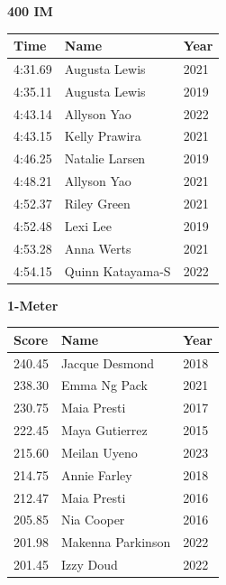 \vspace{1.2em}
\noindent\begin{minipage}[t]{0.48\textwidth}
\centering
\textbf{\textcolor{teamprimary}{400 IM}}\par
\vspace{0.5em}
\centering
\small
\renewcommand{\arraystretch}{1.0}
\setlength{\tabcolsep}{4pt}
\begin{tabular}{@{}p{1.8cm}p{3.0cm}p{1.0cm}@{}}
\toprule
\textbf{Time} & \textbf{Name} & \textbf{Year} \\
\midrule
4:31.69 & Augusta Lewis & 2021 \\
4:35.11 & Augusta Lewis & 2019 \\
4:43.14 & Allyson Yao & 2022 \\
4:43.15 & Kelly Prawira & 2021 \\
4:46.25 & Natalie Larsen & 2019 \\
4:48.21 & Allyson Yao & 2021 \\
4:52.37 & Riley Green & 2021 \\
4:52.48 & Lexi Lee & 2019 \\
4:53.28 & Anna Werts & 2021 \\
4:54.15 & Quinn Katayama-S & 2022 \\
\bottomrule
\end{tabular}
\end{minipage}
\hfill
\begin{minipage}[t]{0.48\textwidth}
\centering
\textbf{\textcolor{teamprimary}{1-Meter}}\par
\vspace{0.5em}
\centering
\small
\renewcommand{\arraystretch}{1.0}
\setlength{\tabcolsep}{4pt}
\begin{tabular}{@{}p{1.8cm}p{3.0cm}p{1.0cm}@{}}
\toprule
\textbf{Score} & \textbf{Name} & \textbf{Year} \\
\midrule
240.45 & Jacque Desmond & 2018 \\
238.30 & Emma Ng Pack & 2021 \\
230.75 & Maia Presti & 2017 \\
222.45 & Maya Gutierrez & 2015 \\
215.60 & Meilan Uyeno & 2023 \\
214.75 & Annie Farley & 2018 \\
212.47 & Maia Presti & 2016 \\
205.85 & Nia Cooper & 2016 \\
201.98 & Makenna Parkinson & 2022 \\
201.45 & Izzy Doud & 2022 \\
\bottomrule
\end{tabular}
\end{minipage}
